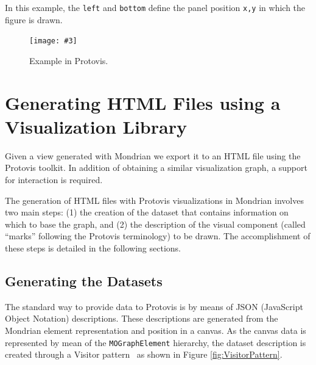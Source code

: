 \documentclass[preprint,10pt]{sigplanconf}
\newcommand{\ct}{\lstinline[backgroundcolor=\color{white},basicstyle=\footnotesize\ttfamily]}
\newcommand{\fig}[4]{
	\begin{figure}[#1]
		\centering
		\texttt{[image: \#3]}
		\caption{\label{fig:#3}#4}
	\end{figure}}
\newcommand{\seclabel}[1]{\label{sec:#1}}
\begin{document}
In this example, the  \ct{left} and \ct{bottom} define the panel position \ct{x,y} in which the figure is drawn.

\fig{h}{0.2}{SimpleBar2}{Example in Protovis.}


\section{Generating HTML Files using a Visualization Library}\seclabel{generating}

Given a view generated with Mondrian we export it to an HTML file using the Protovis toolkit. In addition of obtaining a similar visualization graph, a support for interaction is required. 

The generation of HTML files with Protovis visualizations in Mondrian involves two main steps: (1) the creation of the dataset that contains information on which to base the graph, and (2) the description of the visual component (called ``marks'' following the Protovis terminology) to be drawn. The accomplishment of these steps is detailed in the following sections.

\subsection{Generating the Datasets}
The standard way to provide data to Protovis is by means of JSON (JavaScript Object Notation) descriptions. 
These descriptions are generated from the Mondrian element representation and position in a canvas.
As the canvas data is represented by mean of the \ct{MOGraphElement} hierarchy, the dataset description is created through a Visitor pattern~\cite{Gamm95a} as shown in Figure \ref{fig:VisitorPattern}.
\end{document}

